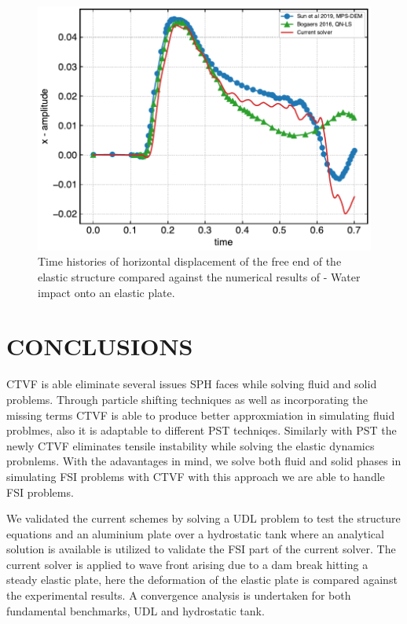 \documentclass[10pt, conference]{FMFP2022}
\begin{document}
\begin{figure}
  \centering
  \includegraphics[scale=0.45]{figures/sun_2019_dam_breaking_flow_impacting_an_elastic_plate/x_amplitude}
  \caption{Time histories of horizontal displacement of the free end of the
    elastic structure compared against the numerical results of
    \cite{sun2019fully,bogaers2016evaluation}- Water impact onto an elastic
    plate.}
\label{fig:water-impact-plate-deflection-quantitative}
\end{figure}

\section{\textbf{CONCLUSIONS}}\label{sec4}

CTVF is able eliminate several issues SPH faces while solving fluid and solid
problems. Through particle shifting techniques as well as incorporating the
missing terms CTVF is able to produce better approxmiation in simulating fluid
problmes, also it is adaptable to different PST techniqes. Similarly with PST
the newly CTVF eliminates tensile instability while solving the elastic dynamics
probnlems. With the adavantages in mind, we solve both fluid and solid phases in
simulating FSI problems with CTVF with this approach we are able to handle FSI
problems.


We validated the current schemes by solving a UDL problem to test the structure
equations and an aluminium plate over a hydrostatic tank where an
analytical solution is available is utilized to validate the FSI part of the
current solver. The current solver is applied to wave front arising due to a dam
break hitting a steady elastic plate, here the deformation of the elastic plate
is compared against the experimental results. A convergence analysis is
undertaken for both fundamental benchmarks, UDL and hydrostatic tank.
\end{document}
